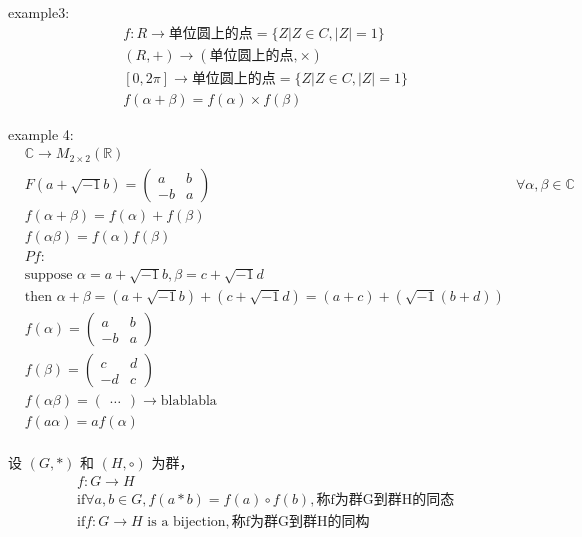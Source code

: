 \documentclass[12pt, a4paper]{article}  %
\begin{document}
example3:
\begin{align}
    &f:R\rightarrow \text{单位圆上的点}=\{Z|Z\in C,|Z|=1\}\\
    &(R,+) \rightarrow (\text{单位圆上的点},\times)\\
    &[0,2\pi] \rightarrow \text{单位圆上的点}=\{Z|Z\in C,|Z|=1\}\\
    &f(\alpha + \beta )=f(\alpha )\times f(\beta )
\end{align}

example 4:
\begin{align}
    &\mathbb{C} \rightarrow M_{2 \times 2}(\mathbb{R}) \\
    &F(a + \sqrt{-1}b) = \begin{pmatrix}
        a & b \\
        -b & a
    \end{pmatrix}
    &\forall \alpha,\beta \in \mathbb{C}\\
    &f(\alpha+\beta)=f(\alpha)+f(\beta)\\
    &f(\alpha \beta)=f(\alpha)f(\beta)\\
    &Pf:\\
    &\text{suppose } \alpha = a + \sqrt{-1}b, \beta = c + \sqrt{-1}d\\
    &\text{then } \alpha + \beta = (a + \sqrt{-1}b) + (c + \sqrt{-1}d) = (a + c) + (\sqrt{-1}(b + d))\\
    &f(\alpha)=\begin{pmatrix}
        a & b \\
        -b & a
    \end{pmatrix}\\
    &f(\beta)=\begin{pmatrix}
        c & d \\
        -d & c
    \end{pmatrix}\\
    &f(\alpha\beta)=\begin{pmatrix}
       \dots
    \end{pmatrix}\rightarrow \text{blablabla}\\
    &f(a\alpha)=af(\alpha)\\
\end{align}

设 $(G,*)$ 和 $(H,\circ)$ 为群，
\begin{align}
    &f:G\rightarrow H\\
    &\text{if} \forall a,b\in G, f(a*b)=f(a)\circ f(b),\text{称f为群G到群H的同态}\\
    & \text{if}  f:G\rightarrow H \text{ is a bijection}, \text{称f为群G到群H的同构}\\
\end{align}
\end{document}
